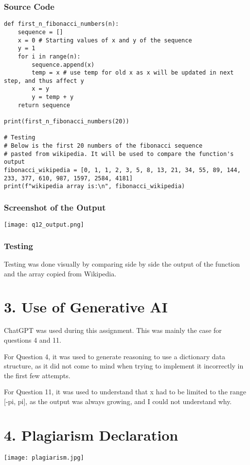 \documentclass{article}
\begin{document}
\subsubsection*{Source Code}
\begin{lstlisting}
def first_n_fibonacci_numbers(n):
    sequence = []
    x = 0 # Starting values of x and y of the sequence
    y = 1
    for i in range(n):
        sequence.append(x)
        temp = x # use temp for old x as x will be updated in next step, and thus affect y
        x = y
        y = temp + y
    return sequence

print(first_n_fibonacci_numbers(20))

# Testing
# Below is the first 20 numbers of the fibonacci sequence
# pasted from wikipedia. It will be used to compare the function's output
fibonacci_wikipedia = [0, 1, 1, 2, 3, 5, 8, 13, 21, 34, 55, 89, 144, 233, 377, 610, 987, 1597, 2584, 4181]
print(f"wikipedia array is:\n", fibonacci_wikipedia)
\end{lstlisting}

\subsubsection*{Screenshot of the Output}
\texttt{[image: q12\_output.png]}

\subsubsection*{Testing}
Testing was done visually by comparing side by side the output of the function and the array copied from Wikipedia.

\section*{3. Use of Generative AI}
ChatGPT was used during this assignment. This was mainly the case for questions 4 and 11. 

For Question 4, it was used to generate reasoning to use a dictionary data structure, as it did not come to mind when trying to implement it incorrectly in the first few attempts. 

For Question 11, it was used to understand that x had to be limited to the range [-pi, pi], as the output was always growing, and I could not understand why. 
\section*{4. Plagiarism Declaration}
\texttt{[image: plagiarism.jpg]}
\end{document}
